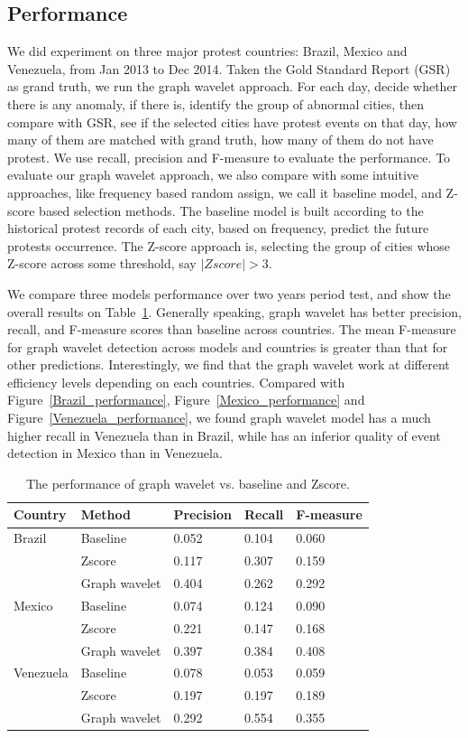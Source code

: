\documentclass[conference]{IEEEtran}
\begin{document}
\subsection{Performance}
We did experiment on three major protest countries: Brazil, Mexico and Venezuela, from Jan 2013 to Dec 2014. Taken the Gold Standard Report (GSR) as grand truth, we run the graph wavelet approach. For each day, decide whether there is any anomaly, if there is, identify the group of abnormal cities, then compare with GSR, see if the selected cities have protest events on that day, how many of them are matched with grand truth, how many of them do not have protest. We use recall, precision and F-measure to evaluate the performance.
To evaluate our graph wavelet approach, we also compare with some intuitive approaches, like frequency based random assign, we call it baseline model, and Z-score based selection methods. The baseline model is built according to the historical protest records of each city, based on frequency, predict the future protests occurrence. The Z-score approach is, selecting the group of cities whose Z-score across some threshold, say $|Zscore|>3$.

We compare three models performance over two years period test, and show the overall results on Table~\ref{table:models_compare}. Generally speaking, graph wavelet has better precision, recall, and F-measure scores than baseline across countries. The mean F-measure for graph wavelet detection across models and countries is greater than that for other predictions. Interestingly, we find that the graph wavelet work at different efficiency levels depending on each countries. Compared with Figure~\ref{Brazil_performance}, Figure~\ref{Mexico_performance} and Figure~\ref{Venezuela_performance}, we found graph wavelet model has a much higher recall in Venezuela than in Brazil, while has an inferior quality of event detection in Mexico than in Venezuela.


\begin{table}[bth] %
\renewcommand{\arraystretch}{1.1}
\caption{\label{table:models_compare} The performance of graph wavelet vs. baseline and Zscore.}
\scriptsize
\centering
\begin{tabular}{ l | l |l | l | l}
\hline
\textbf{Country} & \textbf{Method}& \textbf{Precision}  & \textbf{Recall}  & \textbf{F-measure} \\
\hline
Brazil & Baseline & 0.052 &0.104 & 0.060\\
       & Zscore & 0.117&0.307 & 0.159 \\
 & Graph wavelet& 0.404 &0.262 & 0.292 \\
\hline
Mexico & Baseline & 0.074 &0.124 & 0.090 \\
       & Zscore & 0.221 &0.147 & 0.168 \\
 & Graph wavelet& 0.397 &0.384 & 0.408 \\
\hline
Venezuela & Baseline & 0.078 &0.053 & 0.059 \\
       & Zscore & 0.197 &0.197 & 0.189 \\
 & Graph wavelet& 0.292 &0.554 & 0.355 \\
\hline
\end{tabular}
\end{table}
\end{document}
